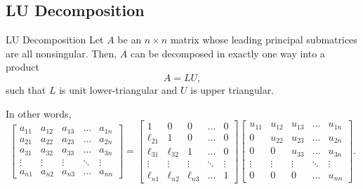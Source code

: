 \documentclass[letterpaper]{article}
\newcommand{\0}{\mathbf{0}}
\begin{document}
\subsection{LU Decomposition}
\begin{theorem}{LU Decomposition}{}
    Let $A$ be an $n \times n$ matrix whose leading principal submatrices are all nonsingular. Then, $A$ can be decomposed in exactly one way into a product 
    \[A = LU,\]
    such that $L$ is unit lower-triangular and $U$ is upper triangular.
\end{theorem}
In other words, 
\[\begin{bmatrix}
    a_{11} & a_{12} & a_{13} & \hdots & a_{1n} \\ 
    a_{21} & a_{22} & a_{23} & \hdots & a_{2n} \\ 
    a_{31} & a_{32} & a_{33} & \hdots & a_{3n} \\ 
    \vdots & \vdots & \vdots & \ddots & \vdots \\ 
    a_{n1} & a_{n2} & a_{n3} & \hdots & a_{nn}
\end{bmatrix} = \begin{bmatrix}
    1 & 0 & 0 & \hdots & 0 \\ 
    \ell_{21} & 1 & 0 & \hdots & 0 \\ 
    \ell_{31} & \ell_{32} & 1 & \hdots & 0 \\ 
    \vdots & \vdots & \vdots & \ddots & \vdots \\ 
    \ell_{n1} & \ell_{n2} & \ell_{n3} & \hdots & 1
\end{bmatrix} \begin{bmatrix}
    u_{11} & u_{12} & u_{13} & \hdots & u_{1n} \\ 
    0 & u_{22} & u_{23} & \hdots & u_{2n} \\ 
    0 & 0 & u_{33} & \hdots & u_{3n} \\
    \vdots & \vdots & \vdots & \ddots & \vdots \\ 
    0 & 0 & 0 & \hdots & u_{nn}
\end{bmatrix}.\]
\end{document}
